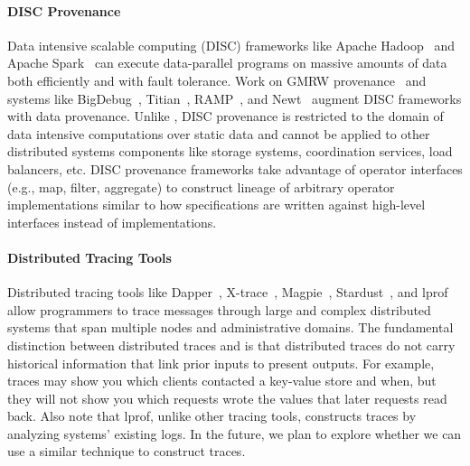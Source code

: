 \paragraph{DISC Provenance}
Data intensive scalable computing (DISC) frameworks like Apache
Hadoop~\cite{shvachko2010hadoop} and Apache Spark~\cite{zaharia2010spark} can
execute data-parallel programs on massive amounts of data both efficiently and
with fault tolerance. Work on GMRW provenance~\cite{ikeda2011provenance} and
systems like BigDebug~\cite{gulzar2016bigdebug},
Titian~\cite{interlandi2015titian}, RAMP~\cite{park2011ramp}, and
Newt~\cite{logothetis2013scalable} augment DISC frameworks with data
provenance.
%
Unlike \watprovenance{}, DISC provenance is restricted to the domain of data
intensive computations over static data and cannot be applied to other
distributed systems components like storage systems, coordination services,
load balancers, etc.
%
DISC provenance frameworks take advantage of operator interfaces (e.g., map,
filter, aggregate) to construct lineage of arbitrary operator implementations
similar to how \watprovenance{} specifications are written against high-level
interfaces instead of implementations.


\paragraph{Distributed Tracing Tools}
Distributed tracing tools like Dapper~\cite{sigelman2010dapper},
X-trace~\cite{fonseca2007x}, Magpie~\cite{barham2003magpie},
Stardust~\cite{thereska2006stardust}, and lprof~\cite{zhao2014lprof} allow
programmers to trace messages through large and complex distributed systems
that span multiple nodes and administrative domains.
The fundamental distinction between distributed traces and \watprovenance{} is
that distributed traces do not carry historical information that link prior
inputs to present outputs. For example, traces may show you which clients
contacted a key-value store and when, but they will not show you which requests
wrote the values that later requests read back.
%
Also note that lprof, unlike other tracing tools, constructs traces by
analyzing systems' existing logs. In the future, we plan to explore whether we
can use a similar technique to construct traces.
